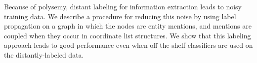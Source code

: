 Because of polysemy, distant labeling for information extraction leads to noisy training data. We describe a procedure for reducing this noise by using label propagation on a graph in which the nodes are entity mentions, and mentions are coupled when they occur in coordinate list structures. We show that this labeling approach leads to good performance even when off-the-shelf classifiers are used on the distantly-labeled data.
